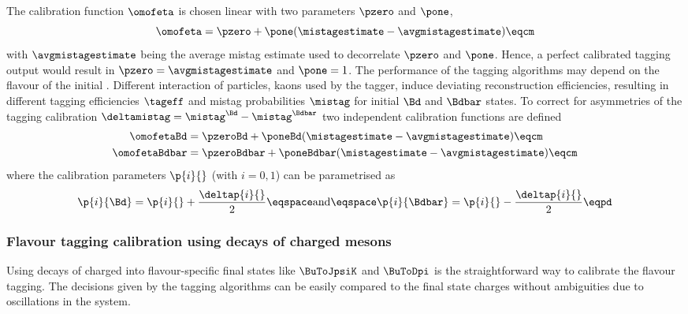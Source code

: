 The calibration function $\omofeta$ is chosen linear with two parameters
$\pzero$ and $\pone$,
%
\begin{equation}\label{eq:flavour_tagging:calibration:method:calibration}
  \omofeta = \pzero + \pone (\mistagestimate - \avgmistagestimate)\eqcm
\end{equation}
%
with $\avgmistagestimate$ being the average mistag estimate used to decorrelate
$\pzero$ and $\pone$. Hence, a perfect calibrated tagging output would result in
$\pzero = \avgmistagestimate$ and $\pone = 1$. The performance of the tagging
algorithms may depend on the flavour of the initial \Bmeson. Different
interaction of particles, \eg kaons used by the \OSK tagger, induce deviating
reconstruction efficiencies, resulting in different tagging efficiencies
$\tageff$ and mistag probabilities $\mistag$ for initial $\Bd$ and $\Bdbar$
states. To correct for asymmetries of the tagging calibration $\deltamistag =
\mistag^{\Bd} - \mistag^{\Bdbar}$ two independent calibration functions are
defined
%
\begin{equation}\label{eq:flavour_tagging:calibration:method:asymmetric_calibration:omega}
  \begin{split}
    \omofetaBd    &= \pzeroBd    + \poneBd    (\mistagestimate - \avgmistagestimate)\eqcm \\
    \omofetaBdbar &= \pzeroBdbar + \poneBdbar (\mistagestimate - \avgmistagestimate)\eqcm
  \end{split}
\end{equation}
%
where the calibration parameters $\p{i}{}$ (with $i=0,1$) can be parametrised as
%
\begin{equation}\label{eq:flavour_tagging:calibration:method:asymmetric_calibration:ps}
  \p{i}{\Bd} = \p{i}{} + \frac{\deltap{i}{}}{2} \eqspace\text{and}\eqspace \p{i}{\Bdbar} = \p{i}{} - \frac{\deltap{i}{}}{2}\eqpd
\end{equation}

\subsubsection[Flavour tagging calibration using decays of charged \Bmesons]{Flavour tagging calibration using decays of charged \Bbfsf mesons}
\label{sec:flavour_tagging:calibration:method:charged}

Using decays of charged \Bmesons into flavour-specific final states like
$\BuToJpsiK$ and $\BuToDpi$ is the straightforward way to calibrate the flavour
tagging. The decisions given by the tagging algorithms can be easily compared to
the final state charges without ambiguities due to oscillations in the \Bmeson
system.


